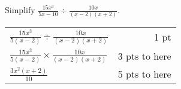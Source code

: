 {
	Simplify $\displaystyle \frac{15x^3}{5x-10}\div\frac{10x}{(x-2)(x+2)}$.
}
{
	\begin{tabular}{l r}
	$\frac{15x^3}{5(x-2)}\div\frac{10x}{(x-2)(x+2)}$ & 1 pt \\
	$\frac{15x^3}{5(x-2)} \times \frac{10x}{(x-2)(x+2)}$ & 3 pts to here\\
	$\frac{3x^2(x+2)}{10}$ & 5 pts to here
	\end{tabular}
}
